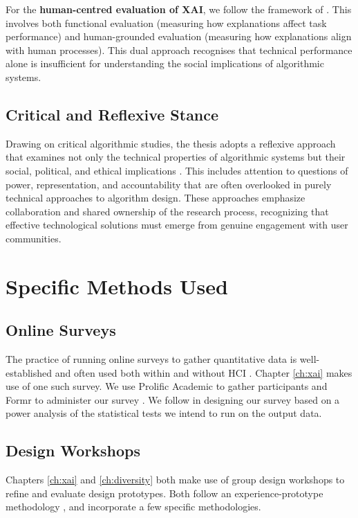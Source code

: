 For the \textbf{human-centred evaluation of XAI}, we follow the framework of \textcite{doshi-velez_towards_2017}. This involves both functional evaluation (measuring how explanations affect task performance) and human-grounded evaluation (measuring how explanations align with human processes). This dual approach recognises that technical performance alone is insufficient for understanding the social implications of algorithmic systems.

\subsection{Critical and Reflexive Stance}\label{ssec:context_reflexivity}
Drawing on critical algorithmic studies, the thesis adopts a reflexive approach that examines not only the technical properties of algorithmic systems but their social, political, and ethical implications \cite{seaver2017algorithms}. This includes attention to questions of power, representation, and accountability that are often overlooked in purely technical approaches to algorithm design. These approaches emphasize collaboration and shared ownership of the research process, recognizing that effective technological solutions must emerge from genuine engagement with user communities.

\section{Specific Methods Used}
\subsection{Online Surveys}
The practice of running online surveys to gather quantitative data is well-established and often used both within and without HCI \cite{zhao2023fairness,pillai_adoption_2020,krishna_disagreement_2022,mai_user_nodate,bansal_does_2021,binns_its_2018,dzindolet_role_2003,papenmeier_its_2022}. Chapter \ref{ch:xai} makes use of one such survey. We use Prolific Academic to gather participants and Formr to administer our survey \cite{binns_its_2018,Arslan_formr_2019}. We follow \textcite{caldwell_power_nodate} in designing our survey based on a power analysis of the statistical tests we intend to run on the output data.

\subsection{Design Workshops}
Chapters \ref{ch:xai} and \ref{ch:diversity} both make use of group design workshops to refine and evaluate design prototypes. Both follow an experience-prototype methodology \cite{Buchenau_Suri_2000}, and incorporate a few specific methodologies.

